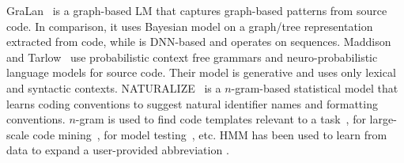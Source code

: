 GraLan~\cite{icse15} is a graph-based LM that captures graph-based
patterns from source code. In comparison, it uses Bayesian model on a
graph/tree representation extracted from code, while {\tool} is
DNN-based and operates on sequences.
Maddison and Tarlow~\cite{tarlow14} use probabilistic context free
grammars and neuro-probabilistic language models for source
code. Their model is generative and uses only lexical and syntactic
contexts.
%
NATURALIZE~\cite{barr-codeconvention-fse14} is a $n$-gram-based
statistical model that learns coding conventions to suggest natural
identifier names and formatting conventions.
%
$n$-gram is used to find code templates relevant to a
task~\cite{jacob10}, for large-scale code mining~\cite{sutton-msr13},
for model testing~\cite{tonella-icse14}, etc.
HMM has been used to learn from data to expand a
user-provided abbreviation \cite{han-ase09}.






